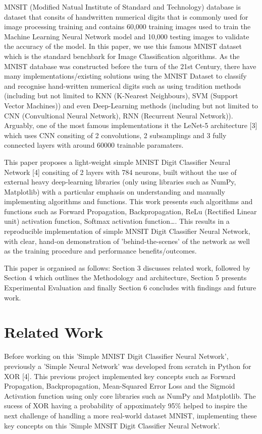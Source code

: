 \documentclass[11pt]{article}
\begin{document}
\vspace{1em}
MNSIT (Modified Natual Institute of Standard and Technology) database is dataset that consits of handwritten numerical digits that is commonly used for image processing training and contains 60,000 training images used to train the Machine Learning Neural Network model and 10,000 testing images to validate the accuracy of the model. In this paper, we use this famous MNIST dataset which is the standard benchbark for Image Classification algorithms. As the MNIST database was constructed before the turn of the 21st Century, there have many implementations/existing solutions using the MNIST Dataset to classify and recognise hand-written numerical digits such as using tradition methods (including but not limited to KNN (K-Nearest Neighbours), SVM (Support Vector Machines)) and even Deep-Learning methods (including but not limited to CNN (Convultional Neural Network), RNN (Recurrent Neural Network)). Arguably, one of the most famous implementations it the LeNet-5 architecture [3] which uses CNN consiting of 2 convolutions, 2 subsamplings and 3 fully connected layers with around 60000 trainable paramaters.

\vspace{1em}
This paper proposes a light-weight simple MNIST Digit Classifier Neural Network [4] consiting of 2 layers with 784 neurons, built without the use of external heavy deep-learning libraries  (only using libraries such as NumPy, Matplotlib) with a particular emphasis on understanding and manually implementing algorithms and functions. This work presents such algorithms and functions such as Forward Propagation, Backpropagation, ReLu (Rectified Linear unit) activation function, Softmax activation function\dots. This results in a reproducible implementation of simple MNSIT Digit Classifier Neural Network, with clear, hand-on demonstration of 'behind-the-scenes' of the network as well as the training procedure and performance benefits/outcomes.

\vspace{1em}
This paper is organised as follows: Section 3 discusses related work, followed by Section 4 which outlines the Methodology and architecture, Section 5 presents Experimental Evaluation and finally Section 6 concludes with findings and future work.


\section{Related Work}
Before working on this 'Simple MNIST Digit Classifier Neural Network', previously a 'Simple Neural Network' was developed from scratch in Python for XOR [4]. This previous project implemented key concepts such as Forward Propagation, Backpropagation, Mean-Squared Error Loss and the Sigmoid Activation function using only core libraries such as NumPy and Matplotlib. The sucess of XOR having a probability of appoximately 95\% helped to inspire the next challenge of handling a more real-world dataset MNIST, implementing these key concepts on this 'Simple MNSIT Digit Classifier Neural Network'.
\end{document}
